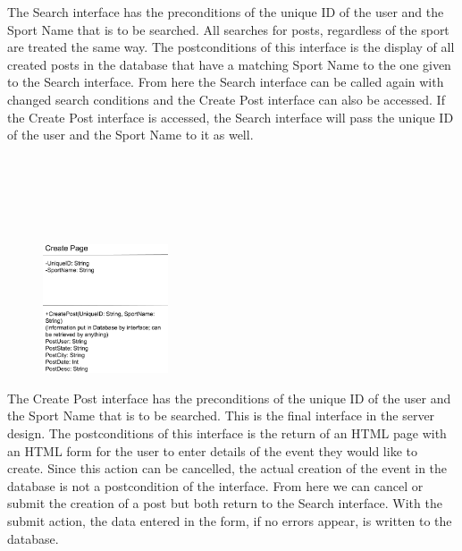 \documentclass[a4paper]{article}
\begin{document}
The Search interface has the preconditions of the unique ID of the user and the Sport Name that is to be searched. 
All searches for posts, regardless of the sport are treated the same way. 
The postconditions of this interface is the display of all created posts in the database that have a matching Sport Name to the one given to the Search interface. 
From here the Search interface can be called again with changed search conditions and the Create Post interface can also be accessed. 
If the Create Post interface is accessed, the Search interface will pass the unique ID of the user and the Sport Name to it as well. \\
\\\\\\\\\\
\begin{figure}
   \centering
   \includegraphics[width=0.33\textwidth]{CreatePost.eps}
\end{figure}

The Create Post interface has the preconditions of the unique ID of the user and the Sport Name that is to be searched. 
This is the final interface in the server design. 
The postconditions of this interface is the return of an HTML page with an HTML form for the user to enter details of the event they would like to create. 
Since this action can be cancelled, the actual creation of the event in the database is not a postcondition of the interface. 
From here we can cancel or submit the creation of a post but both return to the Search interface. 
With the submit action, the data entered in the form, if no errors appear, is written to the database.

\clearpage
\end{document}
